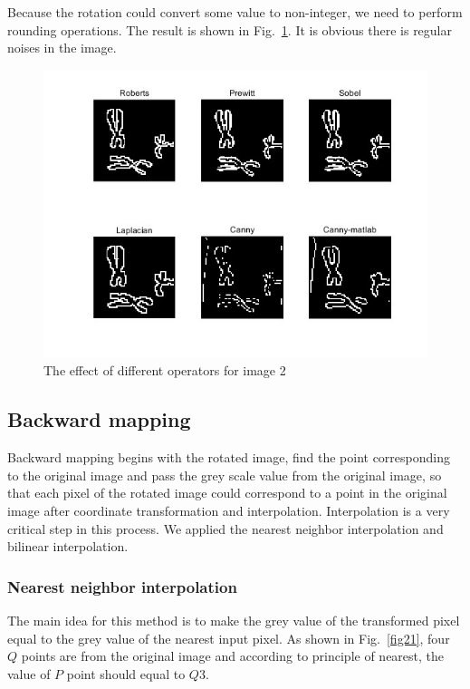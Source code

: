 \documentclass[hyperref]{article}
\theoremstyle{nonumberplain}
\begin{document}
	Because the rotation could convert some value to non-integer, we need to perform rounding operations. The result is shown in Fig.~\ref{fig20}. It is obvious there is regular noises in the image.
	
	\begin{figure}[htbp]
		\centering
		\includegraphics[width=12cm]{fig16a.jpg}
		\caption{The effect of different operators for image 2}
		\label{fig20}
	\end{figure}
	
	\subsection{Backward mapping}
	
	\hspace{1.0em}
	Backward mapping begins with the rotated image, find the point corresponding to the original image and pass the grey scale value from the original image, so that each pixel of the rotated image could correspond to a point in the original image after coordinate transformation and interpolation. Interpolation is a very critical step in this process. We applied the nearest neighbor interpolation and bilinear interpolation.
	
	\subsubsection{Nearest neighbor interpolation}
	
	\hspace{1.0em}
	The main idea for this method is to make the grey value of the transformed pixel equal to the grey value of the nearest input pixel. As shown in Fig.~\ref{fig21}, four $Q$ points are from the original image and according to principle of nearest, the value of $P$ point should equal to $Q3$.
	
\end{document}

